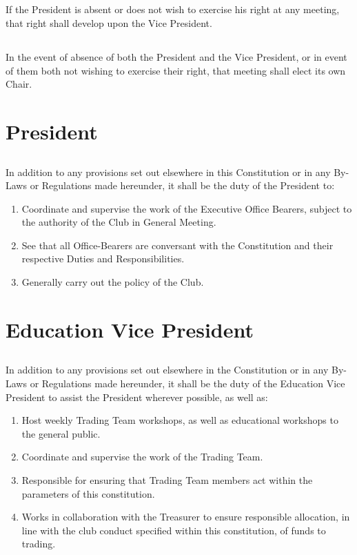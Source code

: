 \documentclass[10.5pt]{article}
\begin{document}
\subsection{} If the President is absent or does not wish to exercise his right at any meeting, that right
shall develop upon the Vice President.
\subsection{} In the event of absence of both the President and the Vice President, or in event of them both not wishing to exercise their right, that meeting shall elect its own Chair.
\newline 


\section{President}
\subsection{} In addition to any provisions set out elsewhere in this Constitution or in any By-Laws or Regulations made hereunder, it shall be the duty of the President to: 
\begin{enumerate}[label=(\alph*)]
    \item Coordinate and supervise the work of the Executive Office Bearers, subject to the authority of the Club in General Meeting. 
    \item See that all Office-Bearers are conversant with the Constitution and their respective Duties and Responsibilities. 
    \item Generally carry out the policy of the Club. 
    \newline
\end{enumerate}


\section{Education Vice President}
\subsection{} In addition to any provisions set out elsewhere in the Constitution or in any By-Laws or Regulations made hereunder, it shall be the duty of the Education Vice President to assist the President wherever possible, as well as:
\begin{enumerate}[label=(\alph*)]
    \item Host weekly Trading Team workshops, as well as educational workshops to the general public.
    \item Coordinate and supervise the work of the Trading Team.
    \item Responsible for ensuring that Trading Team members act within the parameters of this constitution.
    \item Works in collaboration with the Treasurer to ensure responsible allocation, in line with the club conduct specified within this constitution, of funds to trading.
    \newline
\end{enumerate}
\end{document}

